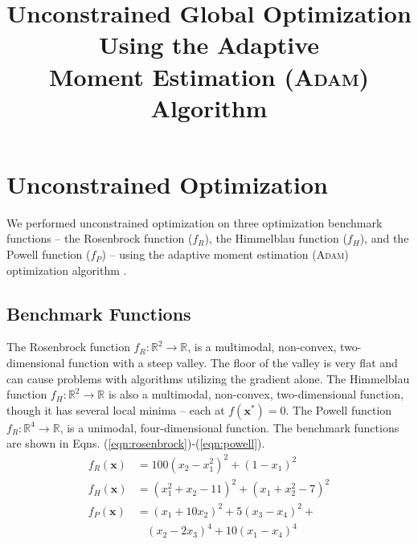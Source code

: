 \documentclass[conference]{IEEEtran}
\begin{document}
\title{\LARGE \textbf{Unconstrained Global Optimization Using the Adaptive \\ Moment Estimation (\textsc{Adam}) Algorithm} 
}


\author{
} %


\maketitle

\section{Unconstrained Optimization}

We performed unconstrained optimization on three optimization benchmark functions -- the Rosenbrock function ($f_R$), the Himmelblau function ($f_H$), and the Powell function ($f_P$) \cite{Rosenbrock1960AnFunction,Himmelblau1972AppliedProgramming,Powell1962AnVariables} -- using the adaptive moment estimation (\textsc{Adam}) optimization algorithm \cite{Kingma2015Adam:Optimization}.

\subsection{Benchmark Functions}

The Rosenbrock function $f_R:\mathbb{R}^2 \rightarrow \mathbb{R}$, is a multimodal, non-convex, two-dimensional function with a steep valley. The floor of the valley is very flat and can cause problems with algorithms utilizing the gradient alone. The Himmelblau function $f_H:\mathbb{R}^2 \rightarrow \mathbb{R}$ is also a multimodal, non-convex, two-dimensional function, though it has several local minima -- each at $f(\textbf{x}^*)=0$. The Powell function $f_R:\mathbb{R}^4 \rightarrow \mathbb{R}$, is a unimodal, four-dimensional function. The benchmark functions are shown in Eqns. (\ref{eqn:rosenbrock})-(\ref{eqn:powell}).
\begin{align}
    f_R(\textbf{x}) &= 100(x_2-x_1^2)^2 + (1-x_1)^2
    \label{eqn:rosenbrock} \\
    f_H(\textbf{x}) &= (x_1^{2}+x_2-11)^{2}+(x_1+x_2^{2}-7)^{2}
    \label{eqn:himmelblau} \\
    f_P(\textbf{x}) &= (x_1 + 10x_2)^2 + 5(x_3-x_4)^2 + \nonumber \\ 
                    & ~~~~(x_2-2x_3)^4 + 10(x_1-x_4)^4
    \label{eqn:powell} 
\end{align}
\end{document}
